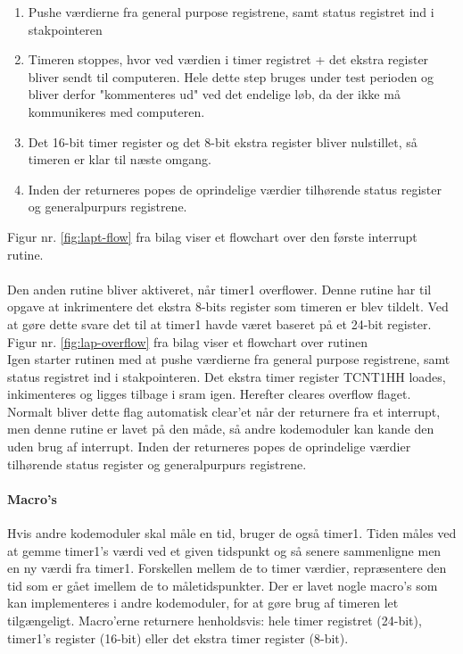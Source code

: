 \begin{enumerate}
\item Pushe værdierne fra general purpose registrene, samt status registret ind i stakpointeren
\item Timeren stoppes, hvor ved værdien i timer registret + det ekstra register bliver sendt til computeren. Hele dette step bruges under test perioden og bliver derfor "kommenteres ud" ved det endelige løb, da der ikke må kommunikeres med computeren.
\item Det 16-bit timer register og det 8-bit ekstra register bliver nulstillet, så timeren er klar til næste omgang.
\item Inden der returneres popes de oprindelige værdier tilhørende status register og generalpurpurs registrene.
\end{enumerate}
Figur nr. \ref{fig:lapt-flow} fra bilag viser et flowchart over den første interrupt rutine.\\
\\


Den anden rutine bliver aktiveret, når timer1 overflower. Denne rutine har til opgave at inkrimentere det ekstra 8-bits register som timeren er blev tildelt. Ved at gøre dette svare det til at timer1 havde været baseret på et 24-bit register. Figur nr. \ref{fig:lap-overflow} fra bilag viser et flowchart over rutinen\\ Igen starter rutinen med at pushe værdierne fra general purpose registrene, samt status registret ind i stakpointeren. Det ekstra timer register TCNT1HH loades, inkimenteres og ligges tilbage i sram igen. Herefter cleares overflow flaget. Normalt bliver dette flag automatisk clear'et når der returnere fra et interrupt, men denne rutine er lavet på den måde, så andre kodemoduler kan kande den uden brug af interrupt. Inden der returneres popes de oprindelige værdier tilhørende status register og generalpurpurs registrene.

\paragraph{Macro's}
Hvis andre kodemoduler skal måle en tid, bruger de også timer1. Tiden måles ved at gemme timer1's værdi ved et given tidspunkt og så senere sammenligne men en ny værdi fra timer1. Forskellen mellem de to timer værdier, repræsentere den tid som er gået imellem de to måletidspunkter.
Der er lavet nogle macro's som kan implementeres i andre kodemoduler, for at gøre brug af timeren let tilgængeligt. Macro'erne returnere henholdsvis: hele timer registret (24-bit), timer1's register (16-bit) eller det ekstra timer register (8-bit). \\
\\
